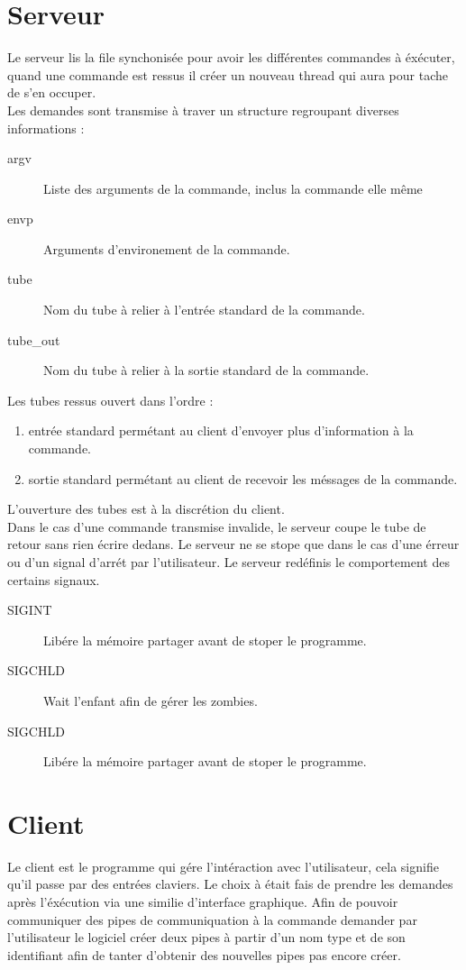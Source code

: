 \documentclass[12pt]{article}
\begin{document}
\newpage
\section{Serveur}
    Le serveur lis la file synchonisée pour avoir les différentes commandes à éxécuter, quand une commande est ressus il créer un nouveau thread qui aura pour tache de s'en occuper.\\
    Les demandes sont transmise à traver un structure regroupant diverses informations :
    \begin{description}
        \item [argv] Liste des arguments de la commande, inclus la commande elle même
        \item [envp] Arguments d'environement de la commande.
        \item [tube\in] Nom du tube à relier à l'entrée standard de la commande.
        \item [tube\_out] Nom du tube à relier à la sortie standard de la commande.
    \end{description}
    Les tubes ressus ouvert dans l'ordre :
    \begin{enumerate}
        \item entrée standard permétant au client d'envoyer plus d'information à la commande.
        \item sortie standard permétant au client de recevoir les méssages de la commande.
    \end{enumerate}
    L'ouverture des tubes est à la discrétion du client.\\
    Dans le cas d'une commande transmise invalide, le serveur coupe le tube de retour sans rien écrire dedans.
    Le serveur ne se stope que dans le cas d'une érreur ou d'un signal d'arrét par l'utilisateur.
    Le serveur redéfinis le comportement des certains signaux.
    \begin{description}
      \item [SIGINT] Libére la mémoire partager avant de stoper le programme.
      \item [SIGCHLD] Wait l'enfant afin de gérer les zombies.
      \item [SIGCHLD] Libére la mémoire partager avant de stoper le programme.
    \end{description}
\newpage
\section{Client}
    Le client est le programme qui gére l'intéraction avec l'utilisateur, cela signifie qu'il passe par des entrées claviers.
    Le choix à était fais de prendre les demandes après l'éxécution via une similie d'interface graphique.
    Afin de pouvoir communiquer des pipes de communiquation à la commande demander par l'utilisateur le logiciel créer deux pipes à partir d'un nom
    type et de son identifiant afin de tanter d'obtenir des nouvelles pipes pas encore créer.
\end{document}
